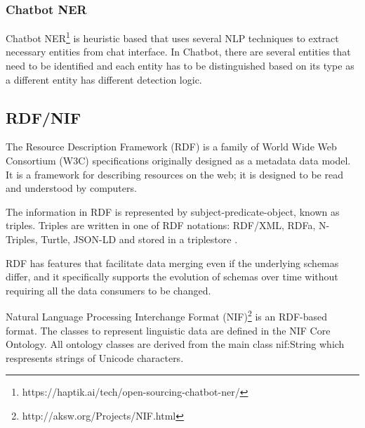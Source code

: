 \documentclass[thesis=M,english]{FITthesis}[2018/05/30]
\begin{document}
\subsubsection{Chatbot NER}\label{Chatbot NER}
Chatbot NER\footnote{https://haptik.ai/tech/open-sourcing-chatbot-ner/} is heuristic based that uses several NLP techniques to extract necessary entities from chat interface. In Chatbot, there are several entities that need to be identified and each entity has to be distinguished based on its type as a different entity has different detection logic. 



\subsection{RDF/NIF}
	The Resource Description Framework (RDF)\cite{wiki:RDF} is a family of World Wide Web Consortium (W3C) specifications originally designed as a metadata data model.  It is a framework for describing resources on the web; it is designed to be read and understood by computers.
	
	The information in RDF is represented by subject-predicate-object, known as triples. Triples are written in one of RDF notations: RDF/XML, RDFa, N-Triples, Turtle, JSON-LD and stored in a triplestore \cite{master:SPARQL}.
	
	RDF \cite{w3c:RDF} has features that facilitate data merging even if the underlying schemas differ, and it specifically supports the evolution of schemas over time without requiring all the data consumers to be changed.

	Natural Language Processing Interchange Format (NIF)\footnote{http://aksw.org/Projects/NIF.html} \cite{w3c:NIF} is an RDF-based format. The classes to represent linguistic data are defined in the NIF Core Ontology. All ontology classes are derived from the main class nif:String which respresents strings of Unicode characters.
	
\end{document}
